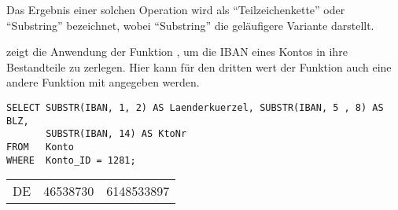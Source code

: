           \begin{merke}
            Das Ergebnis einer solchen Operation wird als \enquote{Teilzeichenkette} oder \enquote{Substring} bezeichnet, wobei \enquote{Substring} die geläufigere Variante darstellt.
          \end{merke}
           zeigt die Anwendung der Funktion , um die IBAN eines Kontos in ihre Bestandteile zu zerlegen. Hier kann für den dritten wert der Funktion auch eine andere Funktion mit angegeben werden.
          \begin{lstlisting}[language=oracle_sql,caption={Die Anwendung der Funktion \languageorasql{SUBSTR}},label=sql03_05]
SELECT SUBSTR(IBAN, 1, 2) AS Laenderkuerzel, SUBSTR(IBAN, 5 , 8) AS BLZ,
       SUBSTR(IBAN, 14) AS KtoNr
FROM   Konto
WHERE  Konto_ID = 1281;
          \end{lstlisting}
          \begin{center}
            \begin{small}
              \tablehead{}
              \begin{oraclesql}
                \begin{supertabular}{lrr}
                  DE & 46538730 & 6148533897 \\
                \end{supertabular}
              \end{oraclesql}
            \end{small}
          \end{center}
